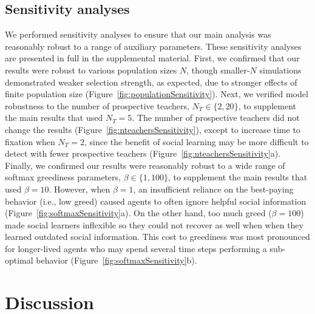 \documentclass[letterpaper,11.5pt]{scrartcl}
\begin{document}
\subsection{Sensitivity analyses}

We performed sensitivity analyses to ensure that our main analysis was reasonably
robust to a range of auxiliary parameters. These sensitivity analyses are presented
in full in the supplemental material. First, we confirmed that our results were
robust to various population sizes $N$, though smaller-$N$ simulations demonstrated
weaker selection strength, as expected, due to stronger effects of finite population size (Figure~\ref{fig:populationSensitivity}). %
Next, we verified model robustness to the number of prospective teachers, $N_T \in
\{2, 20\}$, to supplement the main results that used $N_T = 5$. The number of
prospective teachers did not change the results
(Figure~\ref{fig:nteachersSensitivity}), except to increase time to fixation when $N_T = 2$, since the benefit of social learning may be more difficult to detect with fewer prospective teachers (Figure~\ref{fig:nteachersSensitivity}a). Finally, we confirmed our results were reasonably robust to a wide range of softmax greediness parameters, $\beta \in \{1, 100\}$, to supplement the main results that used $\beta = 10$. However, when $\beta = 1$, an insufficient reliance on the best-paying behavior (i.e., low greed) caused agents to often ignore helpful social information  (Figure~\ref{fig:softmaxSensitivity}a). On the other hand, too much greed ($\beta=100$) made social learners inflexible so they could not recover as well when when they learned outdated social information. This cost to greediness was most pronounced for longer-lived agents who may spend several time steps performing a sub-optimal behavior (Figure~\ref{fig:softmaxSensitivity}b).

\section{Discussion}
\end{document}
